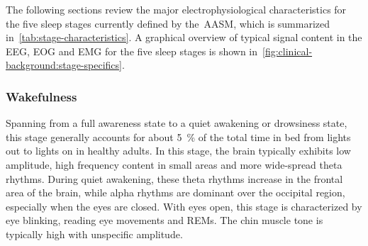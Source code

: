             The following sections review the major electrophysiological characteristics for the five sleep stages currently defined by the~\ac{AASM}, which is summarized in~\cref{tab:stage-characteristics}. 
            A graphical overview of typical signal content in the \ac{EEG}, \ac{EOG} and \ac{EMG} for the five sleep stages is shown in~\cref{fig:clinical-background:stage-specifics}.
            
            \subsubsection{Wakefulness}\label{sec:wakefulness}
            Spanning from a full awareness state to a quiet awakening or drowsiness state, this stage generally accounts for about \SI{5}{\percent} of the total time in bed from lights out to lights on in healthy adults.
            In this stage, the brain typically exhibits low amplitude, high frequency content in small areas and more wide-spread theta rhythms.
            During quiet awakening, these theta rhythms increase in the frontal area of the brain, while alpha rhythms are dominant over the occipital region, especially when the eyes are closed.
            With eyes open, this stage is characterized by eye blinking, reading eye movements and \acp{REM}.
            The chin muscle tone is typically high with unspecific amplitude.
            
